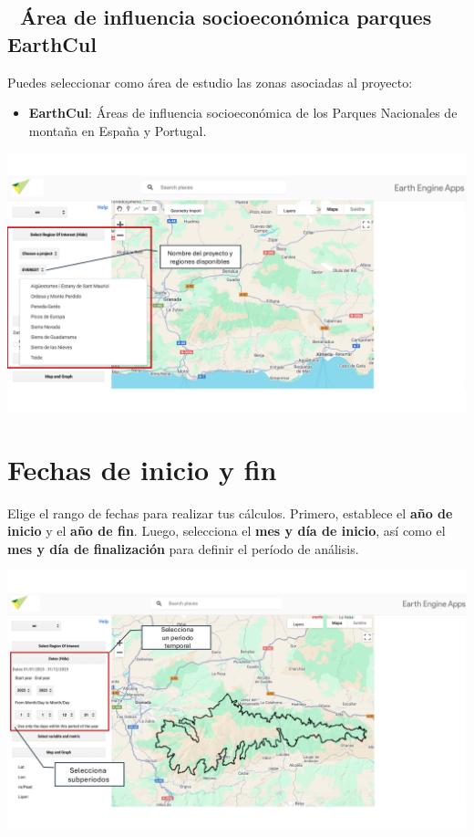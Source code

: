 \documentclass[
]{book}
\providecommand{\tightlist}{%
  \setlength{\itemsep}{0pt}\setlength{\parskip}{0pt}}
\begin{document}
\section{\texorpdfstring{\textbf{📁 Área de influencia socioeconómica parques EarthCul}}{📁 Área de influencia socioeconómica parques EarthCul}}\label{uxe1rea-de-influencia-socioeconuxf3mica-parques-earthcul}

Puedes seleccionar como área de estudio las zonas asociadas al proyecto:

\begin{itemize}
\tightlist
\item
  \textbf{EarthCul}: Áreas de influencia socioeconómica de los Parques Nacionales de montaña en España y Portugal.
\end{itemize}

\includegraphics{assets/PROJECTS_es.png}

\chapter{Fechas de inicio y fin}\label{fechas}

Elige el rango de fechas para realizar tus cálculos. Primero, establece el \textbf{año de inicio} y el \textbf{año de fin}. Luego, selecciona el \textbf{mes y día de inicio}, así como el \textbf{mes y día de finalización} para definir el período de análisis.

\includegraphics{assets/dates_es.png}
\end{document}
